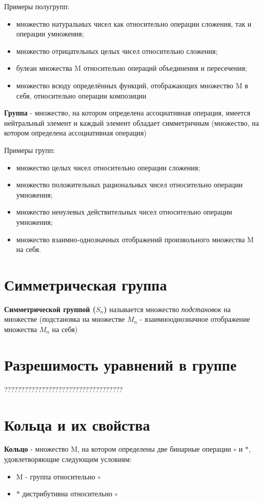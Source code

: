 \documentclass[a4paper]{article}
\begin{document}
Примеры полугрупп:
\begin{itemize}
\item множество натуральных чисел как относительно операции сложения, так и
операции умножения;
\item множество отрицательных целых чисел относительно сложения;
\item булеан множества M относительно операций объединения и пересечения;
\item множество всюду определённых функций, отображающих множество M в
себя, относительно операции композиции
\end{itemize}

\textbf{Группа} - множество, на котором определена ассоциативная операция, имеется нейтральный элемент и каждый элемент обладает симметричным (множество, на котором определена ассоциативная операция)

Примеры групп:
\begin{itemize}
\item множество целых чисел относительно операции сложения;
\item множество положительных рациональных чисел относительно операции
умножения;
\item множество ненулевых действительных чисел относительно операции
умножения;
\item множество взаимно-однозначных отображений произвольного множества M на себя.
\end{itemize}

\section*{Симметрическая группа}
\textbf{Симметрической группой ($S_n$)} называется множество \textit{подстановок} на множестве (подстановка на множестве $M_n$ - взаимнооднозначное отображение множества $M_n$ на себя)

\section*{Разрешимость уравнений в группе
}
???????????????????????????????????
\section*{Кольца и их свойства}
\textbf{Кольцо} - множество M, на котором определены две бинарные операции $\circ$ и $*$, удовлетворяющие следующим условиям:
\begin{itemize}
\item M - группа относительно $\circ$
\item $*$ дистрибутивна относительно $\circ$
\end{itemize}
\end{document}
